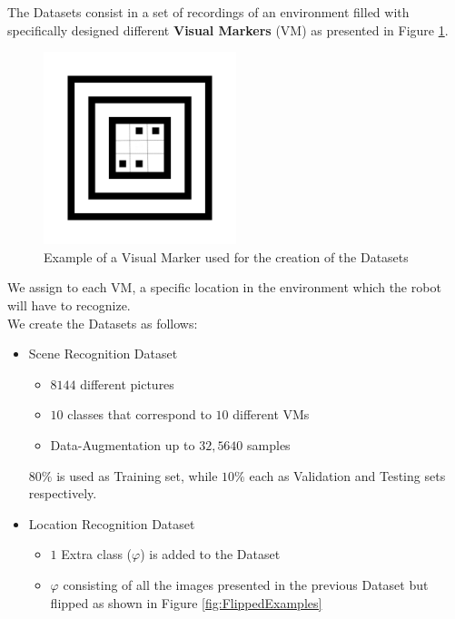 \documentclass[a0, portrait]{IWIposter}
\begin{document}
\begin{multicols}{3}
The Datasets consist in a set of recordings of an environment filled with specifically designed different \textbf{Visual Markers} (VM) as presented in Figure \ref{fig:VisualMarker}. \\

\begin{figure}[H]
	\centering
	\includegraphics[width=0.5\textwidth]{VisualMarker.png}
	\caption{Example of a Visual Marker used for the creation of the Datasets}
	\label{fig:VisualMarker}
\end{figure}

We assign to each VM, a specific location in the environment which the robot will have to recognize. \\
We create the Datasets as follows:  

\begin{itemize}

\item Scene Recognition Dataset

	\begin{itemize}
	\item $8144$ different pictures
	\item $10$ classes that correspond to $10$ different VMs
	\item Data-Augmentation up to $32,5640$ samples
	\end{itemize}

$80\%$ is used as Training set, while $10\%$ each as Validation and Testing sets respectively.

\item Location Recognition Dataset

	\begin{itemize}
	\item $1$ Extra class ($\varphi$) is added to the Dataset
	\item $\varphi$ consisting of all the images presented in the previous Dataset but flipped as shown in Figure \ref{fig:FlippedExamples}
	\end{itemize}


\end{itemize}
\end{multicols}
\end{document}
